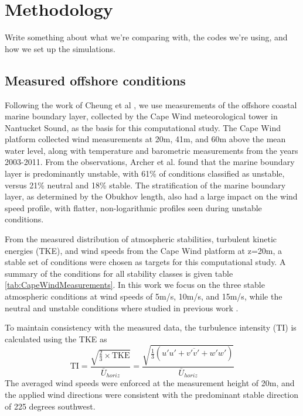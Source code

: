 \section{Methodology}
Write something about what we're comparing with, the codes we're
using, and how we set up the simulations.

\subsection{Measured offshore conditions}

Following the work of Cheung et al \cite{cheung2020large}, we use
measurements of the offshore coastal marine boundary layer, collected
by the Cape Wind meteorological tower in Nantucket Sound, as the basis
for this computational study.  The Cape Wind platform collected wind
measurements at 20m, 41m, and 60m above the mean water level, along
with temperature and barometric measurements from the years 2003-2011.
From the observations, Archer et al.\cite{archer2016predominance}
found that the marine boundary layer is predominantly unstable, with
61\% of conditions classified as unstable, versus 21\% neutral and
18\% stable.  The stratification of the marine boundary layer, as
determined by the Obukhov length, also had a large impact on the wind
speed profile, with flatter, non-logarithmic profiles seen during
unstable conditions.

From the measured distribution of atmospheric stabilities, turbulent
kinetic energies (TKE), and wind speeds from the Cape Wind platform at
z=20m, a stable set of conditions were chosen as targets for this
computational study.  A summary of the conditions for all stability
classes is given table \ref{tab:CapeWindMeasurements}. In this work we
focus on the three stable atmospheric conditions at wind speeds of
5m/s, 10m/s, and 15m/s, while the neutral and unstable conditions
where studied in previous work \cite{cheung2020large}.

To maintain consistency with the measured data, the turbulence
intensity (TI) is calculated using the TKE as
\begin{equation}
  \textrm{TI} =
  \frac{\sqrt{\frac{2}{3}\times\textrm{TKE}}}{\overline{U}_{horiz}} =
  \frac{\sqrt{\frac{1}{3}\left( \overline{u'u' + v'v' + w'w'}
      \right)}}{\overline{U}_{horiz}}
\end{equation}
The averaged wind speeds were enforced at the measurement height of
20m, and the applied wind directions were consistent with the
predominant stable direction of 225 degrees southwest.

